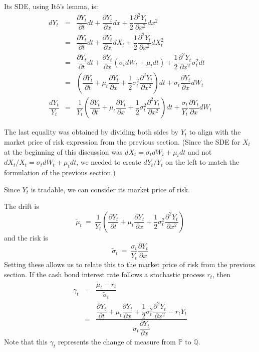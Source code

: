 \documentclass[uplatex,a4j,12pt,dvipdfmx]{jsarticle}
\begin{document}
Its SDE, using Itô's lemma, is:
%
%
\begin{eqnarray*}
	d Y_{t}
	&=&
	\dfrac{ \partial Y_{t} }{ \partial t }
	dt
	+
	\dfrac{ \partial Y_{t} }{ \partial x }
	dx
	+
	\dfrac{1}{2}
	\dfrac{ \partial^{2} Y_{t} }{ \partial x^{2} }
	dx^{2}
	\\ &=&
	\dfrac{ \partial Y_{t} }{ \partial t }
	dt
	+
	\dfrac{ \partial Y_{t} }{ \partial x }
	dX_{t}
	+
	\dfrac{1}{2}
	\dfrac{ \partial^{2} Y_{t} }{ \partial x^{2} }
	dX_{t}^{2}
	\\ &=&
	\dfrac{ \partial Y_{t} }{ \partial t }
	dt
	+
	\dfrac{ \partial Y_{t} }{ \partial x }
	(\sigma_{t} d W_{t} + \mu_{t} dt)
	+
	\dfrac{1}{2}
	\dfrac{ \partial^{2} Y_{t} }{ \partial x^{2} }
	\sigma_{t}^{2} dt
	\\ &=&
	\left(
	\dfrac{ \partial Y_{t} }{ \partial t }
	+
	\mu_{t}
	\dfrac{ \partial Y_{t} }{ \partial x }
	+
	\dfrac{1}{2}
	\sigma_{t}^{2}
	\dfrac{ \partial^{2} Y_{t} }{ \partial x^{2} }
	\right)
	dt
	+
	\sigma_{t}
	\dfrac{ \partial Y_{t} }{ \partial x }
	dW_{t}
	\\
	\dfrac{dY_{t}}{Y_{t}}
	&=&
	\dfrac{1}{Y_{t}}
	\left(
	\dfrac{ \partial Y_{t} }{ \partial t }
	+
	\mu_{t}
	\dfrac{ \partial Y_{t} }{ \partial x }
	+
	\dfrac{1}{2}
	\sigma_{t}^{2}
	\dfrac{ \partial^{2} Y_{t} }{ \partial x^{2} }
	\right)
	dt
	+
	\dfrac{\sigma_{t}}{Y_{t}}
	\dfrac{ \partial Y_{t} }{ \partial x }
	dW_{t}
\end{eqnarray*}
%
%

The last equality was obtained by dividing both sides by $Y_{t}$ to align with the market price of risk expression from the previous section.
(Since the SDE for $X_{t}$ at the beginning of this discussion was $dX_{t}=\sigma_{t} d W_{t} + \mu_{t} dt$ and not $dX_{t}/X_{t}=\sigma_{t} d W_{t} + \mu_{t} dt$, we needed to create $dY_{t}/Y_{t}$ on the left to match the formulation of the previous section.)

Since $Y_{t}$ is tradable, we can consider its market price of risk.

The drift is
$$
	\tilde{\mu}_{t}
	\ = \
	\dfrac{1}{Y_{t}}
	\left(
	\dfrac{ \partial Y_{t} }{ \partial t }
	+
	\mu_{t}
	\dfrac{ \partial Y_{t} }{ \partial x }
	+
	\dfrac{1}{2}
	\sigma_{t}^{2}
	\dfrac{ \partial^{2} Y_{t} }{ \partial x^{2} }
	\right)
$$
and the risk is
$$
	\tilde{\sigma}_{t}
	\ = \
	\dfrac{\sigma_{t}}{Y_{t}}
	\dfrac{ \partial Y_{t} }{ \partial x }
$$
Setting these allows us to relate this to the market price of risk from the previous section. If the cash bond interest rate follows a stochastic process $r_{t}$, then
%
%
\begin{eqnarray*}
	\gamma_{t}
	&=&
	\dfrac{\tilde{\mu}_{t} - r_{t}}{ \tilde{\sigma}_{t} }
	\\ &=&
	\dfrac{
		\dfrac{ \partial Y_{t} }{ \partial t }
		+
		\mu_{t}
		\dfrac{ \partial Y_{t} }{ \partial x }
		+
		\dfrac{1}{2}
		\sigma_{t}^{2}
		\dfrac{ \partial^{2} Y_{t} }{ \partial x^{2} } - r_{t} Y_{t}
	}
	{ \sigma_{t}
		\dfrac{ \partial Y_{t} }{ \partial x }
	}
\end{eqnarray*}
%
%
Note that this $\gamma_{t}$ represents the change of measure from $\mathbb{P}$ to $\mathbb{Q}$.
\end{document}
